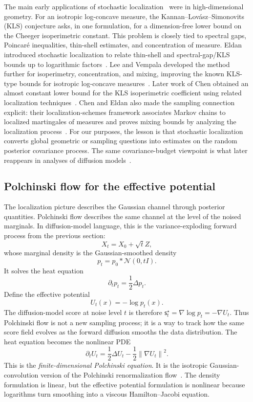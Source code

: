 \documentclass{amsart}
\numberwithin{equation}{section}
\theoremstyle{plain}
\theoremstyle{definition}
\theoremstyle{remark}
\newcommand{\Id}{I}
\newcommand{\norm}[1]{\left\lVert #1 \right\rVert}
\newcommand{\sstar}{\mathsf{s}^{\star}}
\newcommand{\normal}[2]{\mathcal{N}\!\left(#1,#2\right)}
\begin{document}
The main early applications of stochastic localization~\cite{eldan2013thinshell}
were in high-dimensional geometry.  For an isotropic log-concave measure, the
Kannan--Lov\'asz--Simonovits (KLS) conjecture asks, in one formulation, for a
dimension-free lower bound on the Cheeger isoperimetric constant.  This problem
is closely tied to spectral gaps, Poincar\'e inequalities, thin-shell estimates,
and concentration of measure.
Eldan introduced stochastic localization to relate thin-shell and
spectral-gap/KLS bounds up to logarithmic factors~\cite{eldan2013thinshell}.
Lee and Vempala developed the method further for isoperimetry, concentration,
and mixing, improving the known KLS-type bounds for isotropic log-concave
measures~\cite{lee2017eldans}.  Later work of Chen obtained an almost constant
lower bound for the KLS isoperimetric coefficient using related localization
techniques~\cite{chen2021kls}.  Chen and Eldan also made the sampling connection
explicit: their localization-schemes framework associates Markov chains to
localized martingales of measures and proves mixing bounds by analyzing the
localization process~\cite{chen2022localizationschemes}.  For our purposes, the
lesson is that stochastic localization converts global geometric or sampling
questions into estimates on the random posterior covariance process.  The same
covariance-budget viewpoint is what later reappears in analyses of diffusion
models~\cite{montanari2023sampling,benton2024nearlydlinear}.

\subsection{Polchinski flow for the effective potential}

The localization picture describes the Gaussian channel through posterior
quantities.  Polchinski flow describes the same channel at the level of the
noised marginals.  In diffusion-model language, this is the variance-exploding
forward process from the previous section:
\[
    X_t=X_0+\sqrt{t}Z,
\]
whose marginal density is the Gaussian-smoothed density
\[
    p_t=p_0*\normal{0}{t\Id}.
\]
It solves the heat equation
\begin{equation}\label{eq:heat-flow-density}
    \partial_t p_t=\frac12\Delta p_t.
\end{equation}
Define the effective potential
\[
    U_t(x)=-\log p_t(x).
\]
The diffusion-model score at noise level $t$ is therefore
$\sstar_t=\nabla\log p_t=-\nabla U_t$.  Thus Polchinski flow is not a
new sampling process; it is a way to track how the same score field evolves as
the forward diffusion smooths the data distribution.
The heat equation becomes the nonlinear PDE
\begin{equation}\label{eq:polchinski-finite}
    \partial_t U_t
    =
    \frac12\Delta U_t
    -
    \frac12\norm{\nabla U_t}^2.
\end{equation}
This is the \emph{finite-dimensional
Polchinski equation}.  It is the isotropic Gaussian-convolution version of the
Polchinski renormalization
flow~\cite{polchinski1984renormalization,bauerschmidt2024polchinski}.
The density formulation is linear, but the effective potential formulation is
nonlinear because logarithms turn smoothing into a viscous Hamilton--Jacobi
equation.
\end{document}
